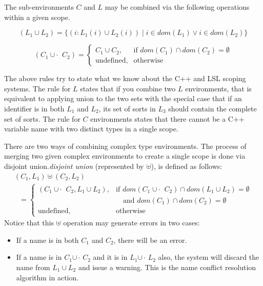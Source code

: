 \documentclass[12pt]{article} %
\newcommand{\udot}{\mbox{$\cup\!\!\!\cdot\,$}}
\begin{document}
The sub-environments $C$ and $L$ may be combined via
the following operations within a given scope.

\begin{equation}
(L_1 \cup L_2)  =  \{ (i:L_1(i) \cup L_2(i)) \mid 
                           i \in dom(L_1) \vee i \in dom(L_2) \}
\end{equation}

\begin{equation}
(C_1 \:\udot\: C_2) = \left\{
 \begin{array}{ll}
C_1 \cup C_2, & \mbox{if $dom(C_1) \cap dom(C_2) = \emptyset$} \\
\mbox{undefined}, & \mbox{otherwise}
\end{array} \right.
\end{equation}

The above rules try to state what we know about the C++ and LSL
scoping systems. The rule for $L$ states that if you combine two $L$
environments, that is equivalent to applying union to the two sets
with the special case that if an identifier is in both $L_1$ and
$L_2$, its set of sorts in $L_3$ should contain the complete set of
sorts. The rule for $C$ environments states that there cannot be a C++ 
variable name with two distinct types in a single scope.

There are two ways of combining complex type environments. The process 
of merging two given complex environments to create a single scope is
done via disjoint union.\emph{disjoint union} (represented by
$\uplus$), is defined as follows:
\begin{equation}
\begin{array}{l}
(C_1,L_1) \uplus (C_2,L_2) \\
~~~ = \left\{
 \begin{array}{ll}
 (C_1 \:\udot\: C_2, L_1 \cup L_2),
    & \mbox{if $dom(C_1 \;\udot\: C_2) \cap dom(L_1 \cup L_2) = \emptyset$} \\
    & \mbox{~~ and $dom(C_1) \cap dom(C_2) = \emptyset$} \\
\mbox{undefined}, & \mbox{otherwise}
\end{array} \right.
\end{array}
\end{equation}
Notice that this $\uplus$ operation may generate errors in two cases:
\begin{itemize}
\item If a name is in both $C_1$ and $C_2$, there will be an error.
\item If a name is in $C_1 \udot C_2$ and it is in $L_1 \udot L_2$ also, 
the system will discard the name from $L_1 \cup L_2$ and issue a
warning. This is the name conflict resolution algorithm in action.
\end{itemize}
\end{document}

